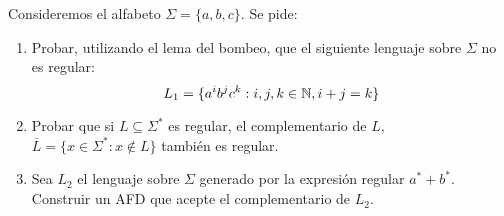 \documentclass[11pt]{article}
\begin{document}
\begin{ejercicio}{4}
Consideremos el alfabeto $\Sigma=\{ a, b, c\}$. Se pide:
\begin{enumerate}
\item Probar, utilizando el lema del bombeo, que el siguiente lenguaje sobre $\Sigma$ no es regular:
$$L_1 = \{a^ib^jc^k : i, j, k \in \mathbb{N}, i + j = k\}$$
\item Probar que si $L\subseteq\Sigma^*$ es regular, el complementario de $L$, $\overline{L} = \{x \in \Sigma^* : x \notin L\}$ también
es regular.
\item Sea $L_2$ el lenguaje sobre $\Sigma$ generado por la expresión regular $a^*+b^*$. Construir un AFD que
acepte el complementario de $L_2$.

\end{enumerate}
\end{ejercicio}
\end{document}
